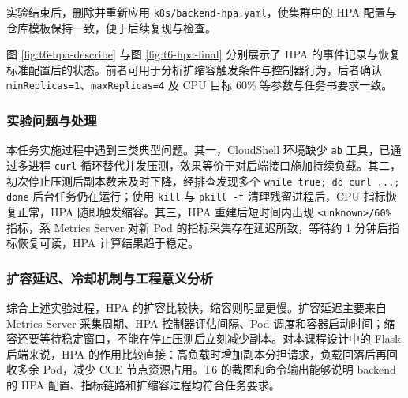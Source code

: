 实验结束后，删除并重新应用 \verb|k8s/backend-hpa.yaml|，使集群中的 HPA 配置与仓库模板保持一致，便于后续复现与检查。



图 \ref{fig:t6-hpa-describe} 与图 \ref{fig:t6-hpa-final} 分别展示了 HPA 的事件记录与恢复标准配置后的状态。前者可用于分析扩缩容触发条件与控制器行为，后者确认 \verb|minReplicas=1|、\verb|maxReplicas=4| 及 CPU 目标 60\% 等参数与任务书要求一致。

\subsubsection{实验问题与处理}

本任务实施过程中遇到三类典型问题。其一，CloudShell 环境缺少 \verb|ab| 工具，已通过多进程 \verb|curl| 循环替代并发压测，效果等价于对后端接口施加持续负载。其二，初次停止压测后副本数未及时下降，经排查发现多个 \verb|while true; do curl ...; done| 后台任务仍在运行；使用 \verb|kill| 与 \verb|pkill -f| 清理残留进程后，CPU 指标恢复正常，HPA 随即触发缩容。其三，HPA 重建后短时间内出现 \verb|<unknown>/60%| 指标，系 Metrics Server 对新 Pod 的指标采集存在延迟所致，等待约 1 分钟后指标恢复可读，HPA 计算结果趋于稳定。

\subsubsection{扩容延迟、冷却机制与工程意义分析}

综合上述实验过程，HPA 的扩容比较快，缩容则明显更慢。扩容延迟主要来自 Metrics Server 采集周期、HPA 控制器评估间隔、Pod 调度和容器启动时间；缩容还要等待稳定窗口，不能在停止压测后立刻减少副本。对本课程设计中的 Flask 后端来说，HPA 的作用比较直接：高负载时增加副本分担请求，负载回落后再回收多余 Pod，减少 CCE 节点资源占用。T6 的截图和命令输出能够说明 backend 的 HPA 配置、指标链路和扩缩容过程均符合任务要求。
